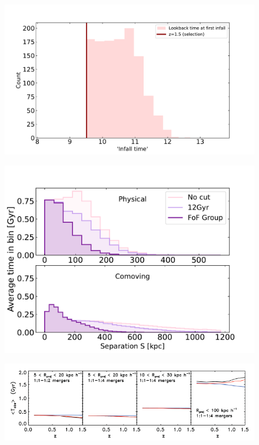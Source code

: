\documentclass[twocolumn]{aastex631}
\begin{document}
\begin{figure}[htb]
    \centering
    \includegraphics[width=\columnwidth]{plots/5_define-beginning/countvsinfalltime.pdf}
    \caption{}
\end{figure}

\begin{figure}[htb]
    \centering
    \includegraphics[width=\columnwidth]{plots/4_timescales/timevssep_phys+co.pdf}
    \caption{}
\end{figure}

\begin{figure}[htb]
    \centering
    \includegraphics[width=\columnwidth]{lotz.png}
    \caption{}
\end{figure}







{}

\end{document}
